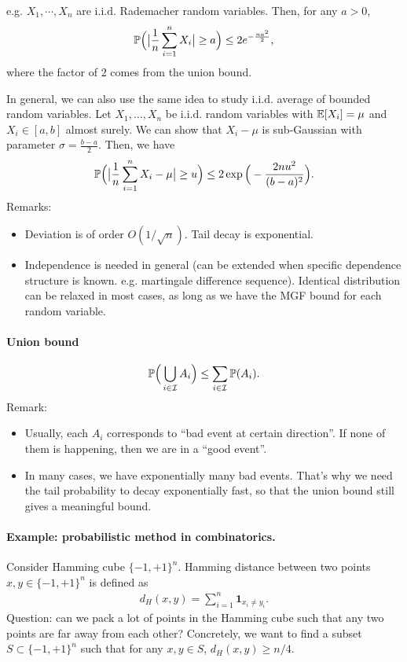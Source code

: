 \documentclass[11pt,letterpaper]{article}
\begin{document}
e.g. $X_1, \cdots, X_n$ are $\mathrm{i.i.d.}$ Rademacher random variables. Then, for any $a > 0$,
\begin{align*}
  {\mathbb{P}} \Big( \big| \frac{1}{n} \sum_{i = 1}^n X_i \big| \geq a \Big) \leq 2 e^{- \frac{n a^2}{2}},
\end{align*}
where the factor of $2$ comes from the union bound.

\bigskip

In general, we can also use the same idea to study $\mathrm{i.i.d.}$ average of bounded random variables. Let $X_1, \ldots, X_n$ be $\mathrm{i.i.d.}$ random variables with ${\mathbb{E}} [X_i] = \mu$ and $X_i \in [a, b]$ almost surely. We can show that $X_i - \mu$ is sub-Gaussian with parameter $\sigma = \frac{b - a}{2}$. Then, we have
\begin{align*}
  {\mathbb{P}} \Big( \big| \frac{1}{n} \sum_{i = 1}^n X_i - \mu \big| \geq u \Big) \leq 2\exp \Big( - \frac{2 n u^2}{(b - a)^2} \Big). 
\end{align*}
Remarks:
\begin{itemize}
  \item Deviation is of order $O(1/\sqrt{n})$. Tail decay is exponential.
  \item Independence is needed in general (can be extended when specific dependence structure is known. e.g. martingale difference sequence). Identical distribution can be relaxed in most cases, as long as we have the MGF bound for each random variable.
\end{itemize}

\paragraph{Union bound}
\begin{align*}
  {\mathbb{P}} \Big( \bigcup_{i \in \mathcal{I}} A_i \Big) \leq \sum_{i \in \mathcal{I}} {\mathbb{P}}(A_i).
\end{align*}
Remark:
\begin{itemize}
  \item Usually, each $A_i$ corresponds to ``bad event at certain direction''. If none of them is happening, then we are in a ``good event''.
  \item In many cases, we have exponentially many bad events. That's why we need the tail probability to decay exponentially fast, so that the union bound still gives a meaningful bound.
\end{itemize}

\paragraph{Example: probabilistic method in combinatorics.} Consider Hamming cube $\{-1 , + 1\}^n$. Hamming distance between two points $x, y \in \{-1, +1\}^n$ is defined as
\begin{align*}
  d_H(x, y) = \sum_{i=1}^n \bm{1}_{x_i \neq y_i}.
\end{align*}
Question: can we pack a lot of points in the Hamming cube such that any two points are far away from each other? Concretely, we want to find a subset $S \subset \{-1, +1\}^n$ such that for any $x, y \in S$, $d_H(x, y) \geq n/4$.
\end{document}
